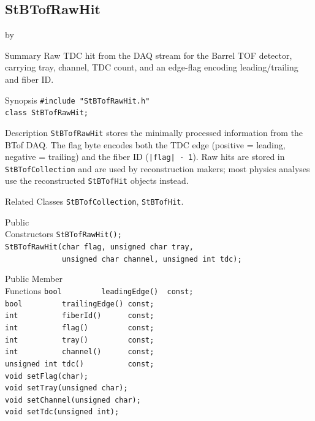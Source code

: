 \documentclass[twoside]{article}
\newcommand{\entrylabel}[1]{\mbox{\textbf{{#1}}}\hfil}%
\newenvironment{entry}
{\begin{list}{}%
    {\renewcommand{\makelabel}{\entrylabel}%
     \setlength{\labelwidth}{90pt}%
     \setlength{\leftmargin}{\labelwidth}
     \advance\leftmargin by \labelsep%
      }%
    }%
  {\end{list}}
\newcommand{\Entrylabel}[1]%
{\raisebox{0pt}[1ex][0pt]{\makebox[\labelwidth][l]%
    {\parbox[t]{\labelwidth}{\hspace{0pt}\textbf{{#1}}}}}}
\newenvironment{Entry}%
{\renewcommand{\entrylabel}{\Entrylabel}\begin{entry}}%
  {\end{entry}}
\begin{document}
\subsection{StBTofRawHit}
\label{sec:StBTofRawHit}
\begin{Entry}
\item[Summary] Raw TDC hit from the DAQ stream for the Barrel TOF detector,
    carrying tray, channel, TDC count, and an edge-flag encoding leading/trailing
    and fiber ID.
\item[Synopsis]
    \verb+#include "StBTofRawHit.h"+\\
    \verb+class StBTofRawHit;+\\
\item[Description]
    \texttt{StBTofRawHit} stores the minimally processed information from the
    BTof DAQ.  The flag byte encodes both the TDC edge (positive = leading, negative
    = trailing) and the fiber ID (\verb+|flag| - 1+).  Raw hits are stored in
    \texttt{StBTofCollection} and are used by reconstruction makers; most
    physics analyses use the reconstructed \texttt{StBTofHit} objects instead.
\item[Related Classes]
    \texttt{StBTofCollection}, \texttt{StBTofHit}.
\item[Public\\ Constructors]
    \verb+StBTofRawHit();+\\
    \verb+StBTofRawHit(char flag, unsigned char tray,+\\
    \verb+             unsigned char channel, unsigned int tdc);+\\
\item[Public Member\\ Functions]
    \verb+bool         leadingEdge()  const;+\\
    \verb+bool         trailingEdge() const;+\\
    \verb+int          fiberId()      const;+\\
    \verb+int          flag()         const;+\\
    \verb+int          tray()         const;+\\
    \verb+int          channel()      const;+\\
    \verb+unsigned int tdc()          const;+\\
    \verb+void setFlag(char);+\\
    \verb+void setTray(unsigned char);+\\
    \verb+void setChannel(unsigned char);+\\
    \verb+void setTdc(unsigned int);+\\
\end{Entry}
\clearpage
\end{document}
